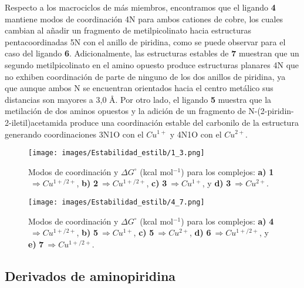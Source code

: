 Respecto a los macrociclos de más miembros, encontramos que el ligando \textbf{4} mantiene modos de coordinación 4N para ambos cationes de cobre, los cuales cambian al añadir un fragmento de metilpicolinato hacia estructuras pentacoordinadas 5N con el anillo de piridina, como se puede observar para el caso del ligando \textbf{6}. Adicionalmente, las estructuras estables de \textbf{7} muestran que un segundo metilpicolinato en el amino opuesto produce estructuras planares 4N que no exhiben coordinación de parte de ninguno de los dos anillos de piridina, ya que aunque ambos N se encuentran orientados hacia el centro metálico sus distancias son mayores a 3,0 \AA. Por otro lado, el ligando \textbf{5} muestra que la metilación de dos aminos opuestos y la adición de un fragmento de N-(2-piridin-2-iletil)acetamida produce una coordinación estable del carbonilo de la estructura generando coordinaciones 3N1O con el $Cu^{1+}$ y 4N1O con el $Cu^{2+}$.

\hspace{0pt}
\vfill
\begin{figure}[ht] 
\centering
\texttt{[image: images/Estabilidad\_estilb/1\_3.png]}
\caption{Modos de coordinación y $\Delta G^{\circ}$ (kcal mol$^{-1}$) para los complejos: \textbf{a)} \textbf{1}$\ \Rightarrow Cu^{1+/2+}$, \textbf{b)} \textbf{2}$\ \Rightarrow Cu^{1+/2+}$, \textbf{c)} \textbf{3}$\ \Rightarrow Cu^{1+}$, y \textbf{d)} \textbf{3}$\ \Rightarrow Cu^{2+}$.}
\label{estcoord_1_3}
\end{figure}
\vfill
\hspace{0pt}

\clearpage

\hspace{0pt}
\vfill
\begin{figure}[ht] 
\centering
\centerline{\texttt{[image: images/Estabilidad\_estilb/4\_7.png]}}
\caption{Modos de coordinación y $\Delta G^{\circ}$ (kcal mol$^{-1}$) para los complejos: \textbf{a)} \textbf{4}$\ \Rightarrow Cu^{1+/2+}$, \textbf{b)} \textbf{5}$\ \Rightarrow Cu^{1+}$, \textbf{c)} \textbf{5}$\ \Rightarrow Cu^{2+}$, \textbf{d)} \textbf{6}$\ \Rightarrow Cu^{1+/2+}$, y \textbf{e)} \textbf{7}$\ \Rightarrow Cu^{1+/2+}$.}\label{estcoord_4_7}
\end{figure}
\vfill
\hspace{0pt}

\clearpage

\subsection{Derivados de aminopiridina}

